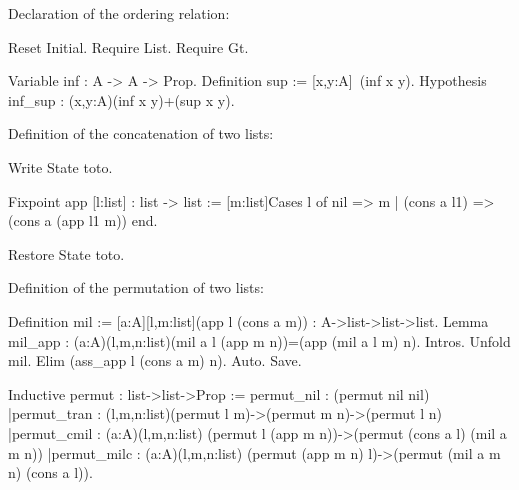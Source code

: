 Declaration of the ordering relation:
\begin{coq_eval}
Reset Initial.
Require List.
Require Gt.
\end{coq_eval}
\begin{coq_example*}
Variable   inf : A -> A -> Prop.
Definition sup  := [x,y:A]~(inf x y).
Hypothesis inf_sup : (x,y:A){(inf x y)}+{(sup x y)}.
\end{coq_example*}
Definition of the concatenation of two lists:
\begin{coq_eval}
Write State toto.
\end{coq_eval}
\begin{coq_example*}
Fixpoint app [l:list] : list -> list 
      := [m:list]Cases l of
                   nil => m 
                 | (cons a l1) => (cons a (app l1 m)) end.
\end{coq_example*}
\begin{coq_eval}
Restore State toto.
\end{coq_eval}
Definition of the permutation of two lists:
\begin{coq_eval}
Definition mil := [a:A][l,m:list](app l (cons a m)) : A->list->list->list.
Lemma mil_app : (a:A)(l,m,n:list)(mil a l (app m n))=(app (mil a l m) n).
        Intros.
        Unfold mil.
        Elim (ass_app l (cons a m) n).
        Auto.
Save.
\end{coq_eval}
\begin{coq_example*}
Inductive permut : list->list->Prop :=
    permut_nil  : (permut nil nil)
   |permut_tran : (l,m,n:list)(permut l m)->(permut m n)->(permut l n)
   |permut_cmil : (a:A)(l,m,n:list)
         (permut l (app m n))->(permut (cons a l) (mil a m n))
   |permut_milc : (a:A)(l,m,n:list)
         (permut (app m n) l)->(permut (mil a m n) (cons a l)).
\end{coq_example*}
